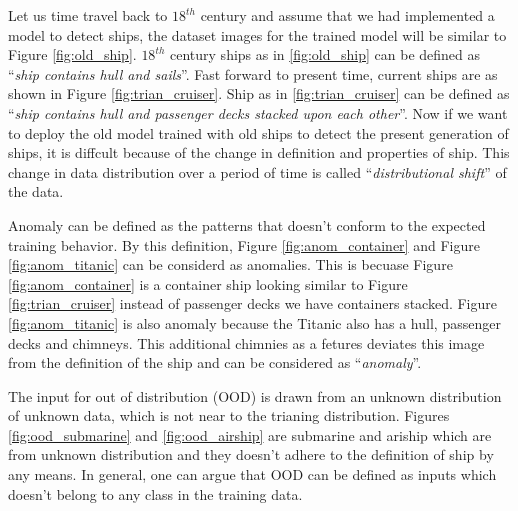 Let us time travel back to $18^{th}$ century and assume that we had implemented a model to detect ships, the dataset images for the trained model will be similar to Figure \ref{fig:old_ship}.
$18^{th}$ century ships as in \ref{fig:old_ship} can be defined as ``\textit{ship contains hull and sails}''.
Fast forward to present time, current ships are as shown in Figure \ref{fig:trian_cruiser}.
Ship as in \ref{fig:trian_cruiser} can be defined as ``\textit{ship contains hull and passenger decks stacked upon each other}''.
Now if we want to deploy the old model trained with old ships to detect the present generation of ships, it is diffcult because of the change in definition and properties of ship. 
This change in data distribution over a period of time is called ``\textit{distributional shift}'' of the data.

Anomaly can be defined as the patterns that doesn't conform to the expected training behavior.
By this definition, Figure \ref{fig:anom_container} and Figure \ref{fig:anom_titanic} can be considerd as anomalies.
This is becuase Figure \ref{fig:anom_container} is a container ship looking similar to Figure \ref{fig:trian_cruiser} instead of passenger decks we have containers stacked.
Figure \ref{fig:anom_titanic} is also anomaly because the Titanic also has a hull, passenger decks and chimneys. 
This additional chimnies as a fetures deviates this image from the definition of the ship and can be considered as ``\textit{anomaly}''.

The input for out of distribution (OOD) is drawn from an unknown distribution of unknown data, which is not near to the trianing distribution.
Figures \ref{fig:ood_submarine} and \ref{fig:ood_airship} are submarine and ariship which are from unknown distribution and they doesn't adhere to the definition of ship by any means.
In general, one can argue that OOD can be defined as inputs which doesn't belong to any class in the training data.

